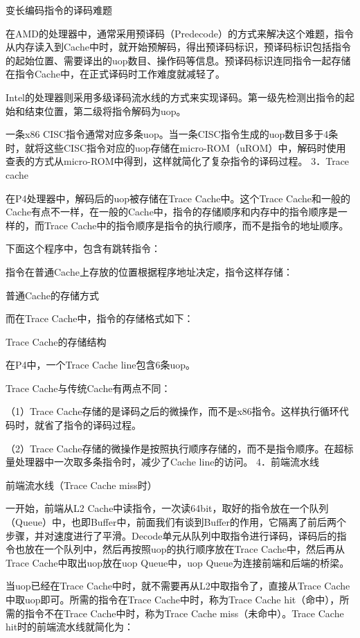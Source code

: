 \documentclass[12pt,UTF8]{ctexbook}
\begin{document}
变长编码指令的译码难题

在AMD的处理器中，通常采用预译码（Predecode）的方式来解决这个难题，指令从内存读入到Cache中时，就开始预解码，得出预译码标识，预译码标识包括指令的起始位置、需要译出的uop数目、操作码等信息。预译码标识连同指令一起存储在指令Cache中，在正式译码时工作难度就减轻了。

Intel的处理器则采用多级译码流水线的方式来实现译码。第一级先检测出指令的起始和结束位置，第二级将指令解码为uop。

一条x86 CISC指令通常对应多条uop。当一条CISC指令生成的uop数目多于4条时，就将这些CISC指令对应的uop存储在micro-ROM（uROM）中，解码时使用查表的方式从micro-ROM中得到，这样就简化了复杂指令的译码过程。
3．Trace cache

在P4处理器中，解码后的uop被存储在Trace Cache中。这个Trace Cache和一般的Cache有点不一样，在一般的Cache中，指令的存储顺序和内存中的指令顺序是一样的，而Trace Cache中的指令顺序是指令的执行顺序，而不是指令的地址顺序。

下面这个程序中，包含有跳转指令：

指令在普通Cache上存放的位置根据程序地址决定，指令这样存储：

普通Cache的存储方式

而在Trace Cache中，指令的存储格式如下：

Trace Cache的存储结构

在P4中，一个Trace Cache line包含6条uop。

Trace Cache与传统Cache有两点不同：

（1）Trace Cache存储的是译码之后的微操作，而不是x86指令。这样执行循环代码时，就省了指令的译码过程。

（2）Trace Cache存储的微操作是按照执行顺序存储的，而不是指令顺序。在超标量处理器中一次取多条指令时，减少了Cache line的访问。
4．前端流水线

前端流水线（Trace Cache miss时）

一开始，前端从L2 Cache中读指令，一次读64bit，取好的指令放在一个队列（Queue）中，也即Buffer中，前面我们有谈到Buffer的作用，它隔离了前后两个步骤，并对速度进行了平滑。Decode单元从队列中取指令进行译码，译码后的指令也放在一个队列中，然后再按照uop的执行顺序放在Trace Cache中，然后再从Trace Cache中取出uop放在uop Queue中，uop Queue为连接前端和后端的桥梁。

当uop已经在Trace Cache中时，就不需要再从L2中取指令了，直接从Trace Cache中取uop即可。所需的指令在Trace Cache中时，称为Trace Cache hit（命中），所需的指令不在Trace Cache中时，称为Trace Cache miss（未命中）。Trace Cache hit时的前端流水线就简化为：
\end{document}
